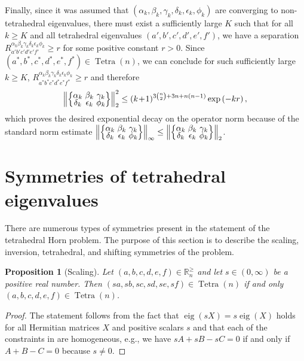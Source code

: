 \documentclass[notitlepage, 11pt, letterpaper]{amsart}
\theoremstyle{plain}
\newtheorem{prop}[thm]{Proposition}
\theoremstyle{definition}
\let\cref\crtcref
\DeclareMathOperator{\Tetra}{Tetra}
\DeclareMathOperator{\eig}{eig}
\newcommand{\polyk}[1]{(k\!+\!1)^{#1}}
\newcommand{\norm}[1]{\left\lVert#1\right\rVert}
\newcommand{\eigs}[1]{\mathbb R^{\geq}_{#1}}
\newcommand{\ea}{a}
\newcommand{\eb}{b}
\newcommand{\ec}{c}
\newcommand{\ed}{d}
\newcommand{\ee}{e}
\newcommand{\ef}{f}
\newcommand{\ya}{\alpha}
\newcommand{\yb}{\beta}
\newcommand{\yc}{\gamma}
\newcommand{\yd}{\delta}
\newcommand{\ye}{\epsilon}
\newcommand{\yf}{\phi}
\newcommand{\tightcurlysixj}[1]{
\begingroup
\arraycolsep=1.5pt
\renewcommand{\arraystretch}{0.3}
\left\{\!\begin{array}{ccc}
    #1
\end{array}\!\right\}
\endgroup
}
\newcommand{\abcdefsymbolk}{\tightcurlysixj{\alpha_k & \beta_k & \gamma_k \\ \delta_k & \epsilon_k & \phi_k}}
\begin{document}
Finally, since it was assumed that $(\ya_k,\yb_k,\yc_k,\yd_k,\ye_k,\yf_k)$ are converging to non-tetrahedral eigenvalues, there must exist a sufficiently large $K$ such that for all $k \geq K$ and all tetrahedral eigenvalues $(\ea',\eb',\ec',\ed',\ee',\ef')$, we have a separation $R_{\ea'\eb'\ec'\ed'\ee'\ef'}^{\ya_k\yb_k\yc_k\yd_k\ye_k\yf_k} \geq r$ for some positive constant $r > 0$.
Since $(\ea^{*},\eb^{*},\ec^{*},\ed^{*},\ee^{*},\ef^{*}) \in \Tetra(n)$, we can conclude for such sufficiently large $k \geq K$, $R_{\ea^{*}\eb^{*}\ec^{*}\ed^{*}\ee^{*}\ef^{*}}^{\ya_k\yb_k\yc_k\yd_k\ye_k\yf_k} \geq r$ and therefore
\begin{equation}
    \norm{\abcdefsymbolk}_{2}^{2} \leq \polyk{3\binom{n}{2}+3n + n(n-1)}  \exp\left( - k r\right),
\end{equation}
which proves the desired exponential decay on the operator norm because of the standard norm estimate $\norm{\abcdefsymbolk}_{\infty} \leq \norm{\abcdefsymbolk}_{2}$.

\appendix

\section{Symmetries of tetrahedral eigenvalues}
\label{sec:symmetries}

There are numerous types of symmetries present in the statement of the tetrahedral Horn problem.
The purpose of this section is to describe the scaling, inversion, tetrahedral, and shifting symmetries of the problem.

\begin{prop}[Scaling]
    \label{prop:scaling}
    Let $(\ea, \eb, \ec, \ed, \ee, \ef) \in \eigs{n}$ and let $s \in (0, \infty)$ be a positive real number.
    Then $(s\ea, s\eb, s\ec, s\ed, s\ee, s\ef) \in \Tetra(n)$ if and only $(\ea, \eb, \ec, \ed, \ee, \ef) \in \Tetra(n)$.
\end{prop}
\begin{proof}
    The statement follows from the fact that $\eig(s X) = s \eig(X)$ holds for all Hermitian matrices $X$ and positive scalars $s$ and that each of the constraints in \cref{eq:tet_cond} are homogeneous, e.g., we have $sA+sB-sC=0$ if and only if $A+B-C=0$ because $s \neq 0$.
\end{proof}
\end{document}
